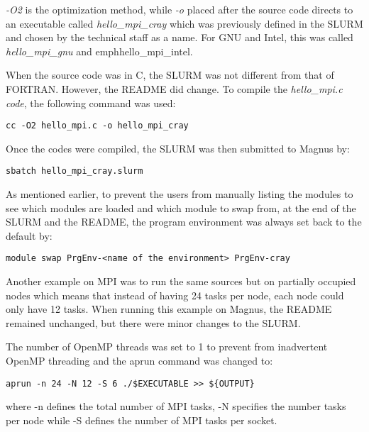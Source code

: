 \emph{-O2} is the optimization method, while \emph{-o} placed after the source code directs to an executable called \emph{hello\_mpi\_cray} which was 
previously defined in the SLURM and chosen by the technical staff as a name. For GNU and Intel, this was called \emph{hello\_mpi\_gnu} and emph{hello\_mpi\_intel.} 

When the source code was in C, the SLURM was not different from that of FORTRAN. However, the README did change. To compile the \emph{hello\_mpi.c code}, the 
following command was used: 

\begin{tcolorbox}
\begin{Verbatim}[fontsize=\scriptsize]
cc -O2 hello_mpi.c -o hello_mpi_cray
\end{Verbatim}
\end{tcolorbox}

Once the codes were compiled, the SLURM was then submitted to Magnus by:

\begin{tcolorbox}
\begin{Verbatim}[fontsize=\scriptsize]
sbatch hello_mpi_cray.slurm 
\end{Verbatim}
\end{tcolorbox}

As mentioned earlier, to prevent the users from manually listing the modules to see which modules are loaded and which module to swap from, at the end
of the SLURM and the README, the program environment was always set back to the default by:

\begin{tcolorbox}
\begin{Verbatim}[fontsize=\scriptsize]
module swap PrgEnv-<name of the environment> PrgEnv-cray
\end{Verbatim}
\end{tcolorbox}

Another example on MPI was to run the same sources but on partially occupied nodes which means that instead of having 24 tasks per node, each node could
only have 12 tasks. When running this example on Magnus, the README remained unchanged, but there were minor changes to the SLURM.

The number of OpenMP threads was set to 1 to prevent from inadvertent OpenMP threading and the aprun command was changed to:

\begin{tcolorbox}
\begin{Verbatim}[fontsize=\scriptsize]
aprun -n 24 -N 12 -S 6 ./$EXECUTABLE >> ${OUTPUT}
\end{Verbatim}
\end{tcolorbox}

where -n defines the total number of MPI tasks, -N specifies the number tasks per node while -S defines the number of MPI tasks per socket.

